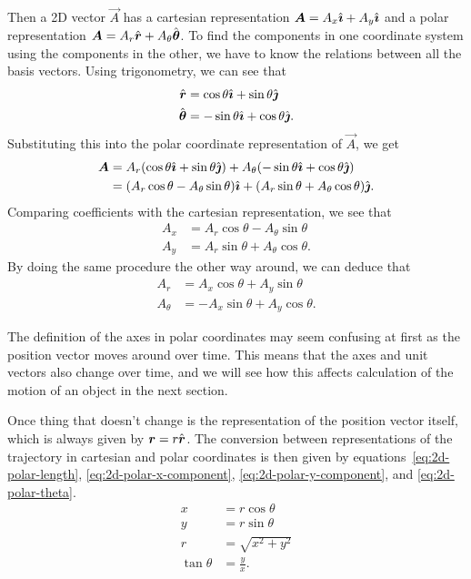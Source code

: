 \documentclass[../classical_mechanics.tex]{subfiles}
\begin{document}
        Then a 2D vector $\vec{A}$ has a cartesian representation $\boldsymbol{A}=A_x\hat{\boldsymbol{\imath}}+A_y\hat{\boldsymbol{\imath}}$ and a polar representation $\boldsymbol{A}=A_r\hat{\boldsymbol{r}}+A_\theta\hat{\boldsymbol{\theta}}$.
        To find the components in one coordinate system using the components in the other, we have to know the relations between all the basis vectors.
        Using trigonometry, we can see that
        \begin{align}
            \hat{\boldsymbol{r}}&=\cos\theta\hat{\boldsymbol{\imath}}+\sin\theta\hat{\boldsymbol{\jmath}}\label{eq:2d-polar-uvec-r}\\
            \hat{\boldsymbol{\theta}}&=-\sin\theta\hat{\boldsymbol{\imath}}+\cos\theta\hat{\boldsymbol{\jmath}}\label{eq:2d-polar-uvec-theta}.
        \end{align}
        Substituting this into the polar coordinate representation of $\vec{A}$, we get
        \begin{align}
            \boldsymbol{A}&=A_r(\cos\theta\hat{\boldsymbol{\imath}}+\sin\theta\hat{\boldsymbol{\jmath}})+A_\theta(-\sin\theta\hat{\boldsymbol{\imath}}+\cos\theta\hat{\boldsymbol{\jmath}})\\
            &=(A_r\cos\theta-A_\theta\sin\theta)\hat{\boldsymbol{\imath}}+(A_r\sin\theta+A_\theta\cos\theta)\hat{\boldsymbol{\jmath}}.
        \end{align}
        Comparing coefficients with the cartesian representation, we see that
        \begin{align}
            A_x&=A_r\cos\theta-A_\theta\sin\theta\\
            A_y&=A_r\sin\theta+A_\theta\cos\theta.
        \end{align}
        By doing the same procedure the other way around, we can deduce that
        \begin{align}
            A_r&=A_x\cos\theta+A_y\sin\theta\\
            A_\theta&=-A_x\sin\theta+A_y\cos\theta.
        \end{align}

        The definition of the axes in polar coordinates may seem confusing at first as the position vector moves around over time.
        This means that the axes and unit vectors also change over time, and we will see how this affects calculation of the motion of an object in the next section.

        Once thing that doesn't change is the representation of the position vector itself, which is always given by $\boldsymbol{r}=r\hat{\boldsymbol{r}}$.
        The conversion between representations of the trajectory in cartesian and polar coordinates is then given by equations~\ref{eq:2d-polar-length}, \ref{eq:2d-polar-x-component}, \ref{eq:2d-polar-y-component}, and \ref{eq:2d-polar-theta}.
        \begin{align}
            x&=r\cos\theta\\
            y&=r\sin\theta\\
            r&=\sqrt{x^2+y^2}\\
            \tan\theta&=\frac{y}{x}.
        \end{align}
\end{document}
